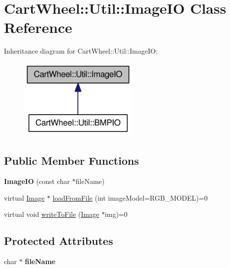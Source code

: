 \hypertarget{classCartWheel_1_1Util_1_1ImageIO}{
\section{CartWheel::Util::ImageIO Class Reference}
\label{classCartWheel_1_1Util_1_1ImageIO}
}


Inheritance diagram for CartWheel::Util::ImageIO:\nopagebreak
\begin{figure}[H]
\begin{center}
\leavevmode
\includegraphics[width=166pt]{classCartWheel_1_1Util_1_1ImageIO__inherit__graph}
\end{center}
\end{figure}
\subsection*{Public Member Functions}
\begin{DoxyCompactItemize}
\item 
\hypertarget{classCartWheel_1_1Util_1_1ImageIO_a4709efbb718b7edc59748be9fd9cde4d}{
{\bfseries ImageIO} (const char $\ast$fileName)}
\label{classCartWheel_1_1Util_1_1ImageIO_a4709efbb718b7edc59748be9fd9cde4d}

\item 
virtual \hyperlink{classCartWheel_1_1Util_1_1Image}{Image} $\ast$ \hyperlink{classCartWheel_1_1Util_1_1ImageIO_a49fb3a4d44a8cabeb66ca06eca15879f}{loadFromFile} (int imageModel=RGB\_\-MODEL)=0
\item 
virtual void \hyperlink{classCartWheel_1_1Util_1_1ImageIO_a49ce6fbe969f416bc526954f4d13b062}{writeToFile} (\hyperlink{classCartWheel_1_1Util_1_1Image}{Image} $\ast$img)=0
\end{DoxyCompactItemize}
\subsection*{Protected Attributes}
\begin{DoxyCompactItemize}
\item 
\hypertarget{classCartWheel_1_1Util_1_1ImageIO_a4044d08dd9855e9b88cce27d11721569}{
char $\ast$ {\bfseries fileName}}
\label{classCartWheel_1_1Util_1_1ImageIO_a4044d08dd9855e9b88cce27d11721569}

\end{DoxyCompactItemize}


